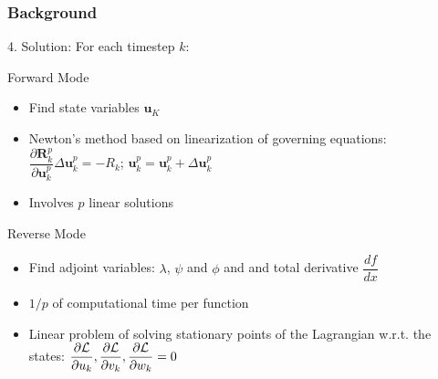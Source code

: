 \documentclass{beamer}
\newcommand{\pd}[2]{\dfrac{\partial #1}{\partial #2}}
\newcommand{\pf}[2]{\dfrac{d #1}{d #2}}
\begin{document}
\begin{frame}\frametitle{Background}\tiny{

    \begin{minipage}{\linewidth}
      \begin{minipage}{0.49\linewidth}
        \begin{block}{4. Solution:}
          For each timestep $k$:
          \begin{block}{Forward Mode}
            \begin{itemize}
            \item Find state variables $\mathbf{u}_K$
            \item Newton's method based on linearization of governing equations:
              {$ \pd{\mathbf{R}_k^p}{\mathbf{u}_k^p} \Delta \mathbf{u}_k^p   = - R_k$; $\mathbf{u}_k^p = \mathbf{u}_k^p + \Delta \mathbf{u}_k^p$} 
            \item Involves $p$ linear solutions
            \end{itemize}
          \end{block}
          \begin{block}{Reverse Mode}
            \begin{itemize}
            \item Find adjoint variables: $\lambda$, $\psi$ and
              $\phi$ and 
              and total derivative $\pf{f}{x}$
            \item $1/p$ of computational time \alert{per function}
            \item Linear problem of solving stationary points of the
              Lagrangian w.r.t. the states:
              {${\pd{\cal{L}}{u_k}},{\pd{\cal{L}}{v_k}},
                {\pd{\cal{L}}{w_k}} = 0$}
            \end{itemize}
          \end{block}
        \end{block}
      \end{minipage}
      \begin{minipage}{0.49\linewidth}
        \begin{figure}
          \centering

\end{figure}
\end{minipage}
\end{minipage}}
\end{frame}
\end{document}
